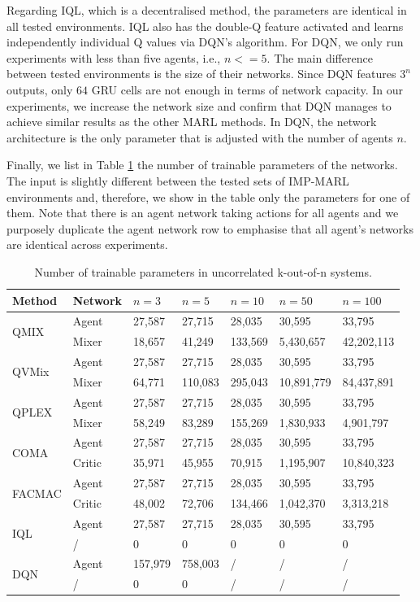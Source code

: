 Regarding IQL, which is a decentralised method, the parameters are identical in all tested environments.
IQL also has the double-Q feature activated and learns independently individual Q values via DQN's algorithm.
For DQN, we only run experiments with less than five agents, i.e., $n<=5$.
The main difference between tested environments is the size of their networks. 
Since DQN features $3^n$ outputs, only $64$ GRU cells are not enough in terms of network capacity. 
In our experiments, we increase the network size and confirm that DQN manages to achieve similar results as the other MARL methods.
In DQN, the network architecture is the only parameter that is adjusted with the number of agents $n$.

Finally, we list in Table \ref{tab:n_param_train} the number of trainable parameters of the networks.
The input is slightly different between the tested sets of IMP-MARL environments and, therefore, we show in the table only the parameters for one of them.
Note that there is an agent network taking actions for all agents and we purposely duplicate the agent network row to emphasise that all agent's networks are identical across experiments.

\begin{table}
    \caption{Number of trainable parameters in uncorrelated k-out-of-n systems.}
    \centering
    \begin{tabular}{lllllll}
    \toprule
    Method & Network & $n=3$ & $n=5$ & $n=10$ & $n=50$ & $n=100$ \\
    \midrule
    \multirow{2}{*}{QMIX} & Agent & 27,587 & 27,715 & 28,035 & 30,595 & 33,795 \\
 & Mixer & 18,657 & 41,249 & 133,569 & 5,430,657 & 42,202,113 \\
\multirow{2}{*}{QVMix} & Agent & 27,587 & 27,715 & 28,035 & 30,595 & 33,795 \\
 & Mixer & 64,771 & 110,083 & 295,043 & 10,891,779 & 84,437,891 \\
\multirow{2}{*}{QPLEX} & Agent & 27,587 & 27,715 & 28,035 & 30,595 & 33,795 \\
 & Mixer & 58,249 & 83,289 & 155,269 & 1,830,933 & 4,901,797 \\
\multirow{2}{*}{COMA} & Agent & 27,587 & 27,715 & 28,035 & 30,595 & 33,795 \\
 & Critic & 35,971 & 45,955 & 70,915 & 1,195,907 & 10,840,323 \\
\multirow{2}{*}{FACMAC} & Agent & 27,587 & 27,715 & 28,035 & 30,595 & 33,795 \\
 & Critic & 48,002 & 72,706 & 134,466 & 1,042,370 & 3,313,218 \\
\multirow{2}{*}{IQL} & Agent & 27,587 & 27,715 & 28,035 & 30,595 & 33,795 \\
 & / & 0 & 0 & 0 & 0 & 0 \\
\multirow{2}{*}{DQN} & Agent & 157,979 & 758,003 & / & / & / \\
 & / & 0 & 0 & / & / & / \\
    \bottomrule
    \end{tabular}
    \label{tab:n_param_train}
\end{table}




